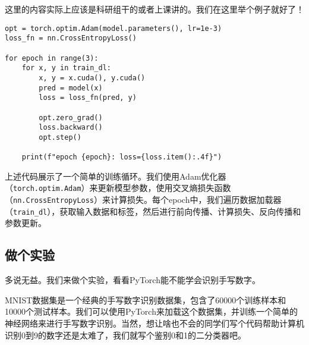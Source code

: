 \documentclass[../main.tex]{subfiles}
\begin{document}
这里的内容实际上应该是科研组干的或者上课讲的。我们在这里举个例子就好了！

\begin{lstlisting}
opt = torch.optim.Adam(model.parameters(), lr=1e-3)
loss_fn = nn.CrossEntropyLoss()

for epoch in range(3):
    for x, y in train_dl:
        x, y = x.cuda(), y.cuda()
        pred = model(x)
        loss = loss_fn(pred, y)

        opt.zero_grad()
        loss.backward()
        opt.step()

    print(f"epoch {epoch}: loss={loss.item():.4f}")
\end{lstlisting}

上述代码展示了一个简单的训练循环。我们使用Adam优化器（\texttt{torch.optim.Adam}）来更新模型参数，使用交叉熵损失函数（\texttt{nn.CrossEntropyLoss}）来计算损失。每个epoch中，我们遍历数据加载器（\texttt{train\_dl}），获取输入数据和标签，然后进行前向传播、计算损失、反向传播和参数更新。

\subsection{做个实验}

多说无益。我们来做个实验，看看PyTorch能不能学会识别手写数字。

MNIST数据集是一个经典的手写数字识别数据集，包含了60000个训练样本和10000个测试样本。我们可以使用PyTorch来加载这个数据集，并训练一个简单的神经网络来进行手写数字识别。当然，想让啥也不会的同学们写个代码帮助计算机识别0到9的数字还是太难了，我们就写个鉴别0和1的二分类器吧。
\end{document}
